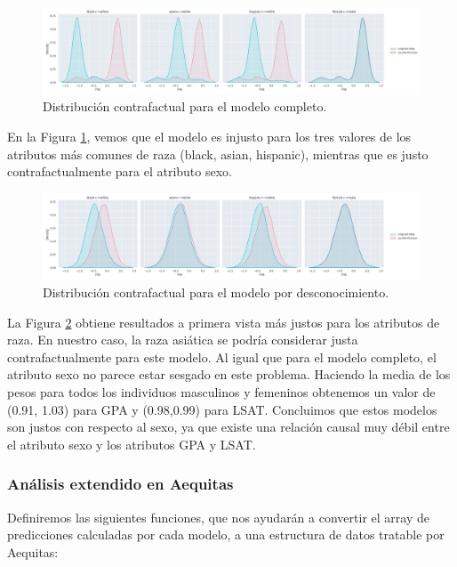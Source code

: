 \documentclass[oneside,openright,titlepage,numbers=noenddot,openany,headinclude,footinclude=true,
cleardoublepage=empty,abstractoff,BCOR=5mm,paper=a4,fontsize=12pt,main=spanish]{scrreprt}
\begin{document}
\begin{figure}[h]
	\centering
	\includegraphics[width=16.8cm]{grafofull.png}
	\caption{Distribución contrafactual para el modelo completo.}
    \label{fig:grafofull}
\end{figure}

En la Figura \ref{fig:grafofull}, vemos que el modelo es injusto para los tres valores de los atributos más comunes de raza (black, asian, hispanic), mientras que es justo contrafactualmente para el atributo sexo.\\

\begin{figure}[h]
	\centering
	\includegraphics[width=16.8cm]{grafoware.png}
	\caption{Distribución contrafactual para el modelo por desconocimiento.}
    \label{fig:grafoware}
\end{figure}

La Figura \ref{fig:grafoware} obtiene resultados a primera vista más justos para los atributos de raza. En nuestro caso, la raza asiática se podría considerar justa contrafactualmente para este modelo. Al igual que para el modelo completo, el atributo sexo no parece estar sesgado en este problema. Haciendo la media de los pesos para todos los individuos masculinos y femeninos obtenemos un valor de (0.91, 1.03) para GPA y (0.98,0.99) para LSAT. Concluimos que estos modelos son justos con respecto al sexo, ya que existe una relación causal muy débil entre el atributo sexo y los atributos GPA y LSAT.

\subsubsection{Análisis extendido en Aequitas}

Definiremos las siguientes funciones, que nos ayudarán a convertir el array de predicciones calculadas por cada modelo, a una estructura de datos tratable por Aequitas:
\end{document}
